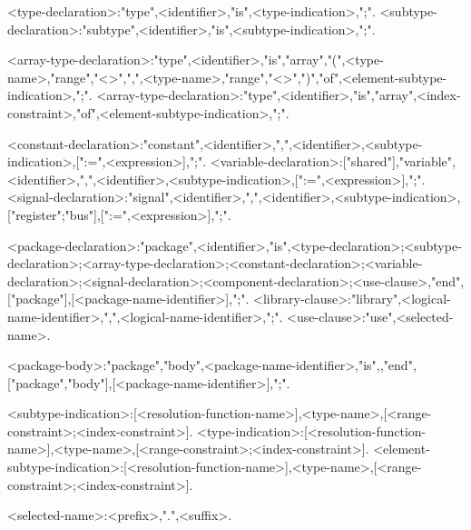 <type-declaration>:"type",<identifier>,"is",<type-indication>,";".
<subtype-declaration>:"subtype",<identifier>,"is",<subtype-indication>,";".

<array-type-declaration>:"type",<identifier>,"is","array","(",<type-name>,"range","\textless\textgreater",{",",<type-name>,"range","\textless\textgreater"},")","of",<element-subtype-indication>,";".
<array-type-declaration>:"type",<identifier>,"is","array",<index-constraint>,"of",<element-subtype-indication>,";".

<constant-declaration>:"constant",<identifier>,{",",<identifier>},<subtype-indication>,[":=",<expression>],";".
<variable-declaration>:["shared"],"variable",<identifier>,{",",<identifier>},<subtype-indication>,[":=",<expression>],";".
<signal-declaration>:"signal",<identifier>,{",",<identifier>},<subtype-indication>,["register";"bus"],[":=",<expression>],";".

<package-declaration>:"package",<identifier>,"is",{<type-declaration>;<subtype-declaration>;<array-type-declaration>;<constant-declaration>;<variable-declaration>;<signal-declaration>;<component-declaration>;<use-clause>},"end",["package"],[<package-name-identifier>],";".
<library-clause>:"library",<logical-name-identifier>,{",",<logical-name-identifier>},";".
<use-clause>:"use",<selected-name>.

<package-body>:"package","body",<package-name-identifier>,"is",{},"end",["package","body"],[<package-name-identifier>],";".

<subtype-indication>:[<resolution-function-name>],<type-name>,[<range-constraint>;<index-constraint>].
<type-indication>:[<resolution-function-name>],<type-name>,[<range-constraint>;<index-constraint>].
<element-subtype-indication>:[<resolution-function-name>],<type-name>,[<range-constraint>;<index-constraint>].

<selected-name>:<prefix>,".",<suffix>.
